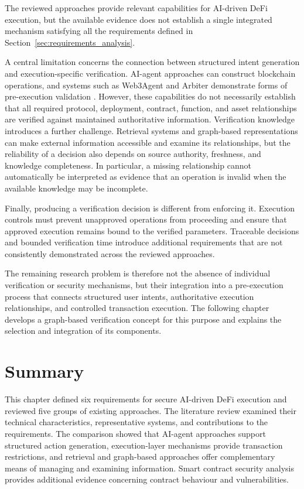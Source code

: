 The reviewed approaches provide relevant capabilities for
AI-driven DeFi execution, but the available evidence does
not establish a single integrated mechanism satisfying all
the requirements defined in
Section~\ref{sec:requirements_analysis}.

A central limitation concerns the connection between
structured intent generation and execution-specific
verification. AI-agent approaches can construct blockchain
operations, and systems such as Web3Agent and Arbiter
demonstrate forms of pre-execution validation
\cite{TODO_Web3Agent,TODO_Arbiter2026}.
However, these capabilities do not necessarily establish
that all required protocol, deployment, contract, function,
and asset relationships are verified against maintained
authoritative information. Verification knowledge introduces a further challenge.
Retrieval systems and graph-based representations can make
external information accessible and examine its relationships,
but the reliability of a decision also depends on source
authority, freshness, and knowledge completeness. In
particular, a missing relationship cannot automatically
be interpreted as evidence that an operation is invalid
when the available knowledge may be incomplete.

Finally, producing a verification decision is different
from enforcing it. Execution controls must prevent
unapproved operations from proceeding and ensure that
approved execution remains bound to the verified parameters.
Traceable decisions and bounded verification time introduce
additional requirements that are not consistently
demonstrated across the reviewed approaches.

The remaining research problem is therefore not the absence
of individual verification or security mechanisms, but
their integration into a pre-execution process that connects
structured user intents, authoritative execution relationships,
and controlled transaction execution. The following chapter
develops a graph-based verification concept for this purpose
and explains the selection and integration of its components.



\section{Summary}
\label{sec:sota_summary}

This chapter defined six requirements for secure AI-driven
DeFi execution and reviewed five groups of existing
approaches. The literature review examined their technical
characteristics, representative systems, and contributions
to the requirements. The comparison showed that AI-agent
approaches support structured action generation, execution-layer
mechanisms provide transaction restrictions, and retrieval
and graph-based approaches offer complementary means of
managing and examining information. Smart contract security
analysis provides additional evidence concerning contract
behaviour and vulnerabilities.

